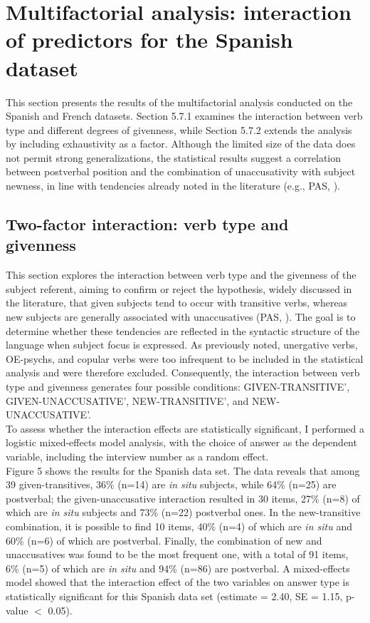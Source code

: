 \section{Multifactorial analysis: interaction of predictors for the Spanish dataset}

This section presents the results of the multifactorial analysis conducted on the Spanish and French datasets. Section 5.7.1 examines the interaction between verb type and different degrees of givenness, while Section 5.7.2 extends the analysis by including exhaustivity as a factor. Although the limited size of the data does not permit strong generalizations, the statistical results suggest a correlation between postverbal position and the combination of unaccusativity with subject newness, in line with tendencies already noted in the literature (e.g., PAS, \cite{du2003preferred}). 

\subsection{Two-factor interaction: verb type and givenness}
This section explores the interaction between verb type and the givenness of the subject referent, aiming to confirm or reject the hypothesis, widely discussed in the literature, that given subjects tend to occur with transitive verbs, whereas new subjects are generally associated with unaccusatives (PAS, \cite{du2003preferred}). The goal is to determine whether these tendencies are reflected in the syntactic structure of the language when subject focus is expressed.
As previously noted, unergative verbs, OE-psychs, and copular verbs were too infrequent to be included in the statistical analysis and were therefore excluded. Consequently, the interaction between verb type and givenness generates four possible conditions: {\selectfont GIVEN-TRANSITIVE}', {\selectfont GIVEN-UNACCUSATIVE}', {\selectfont NEW-TRANSITIVE}', and {\selectfont NEW-UNACCUSATIVE}'. \\
To assess whether the interaction effects are statistically significant, I performed a logistic mixed-effects model analysis, with the choice of answer as the dependent variable, including the interview number as a random effect.\\
Figure 5 shows the results for the Spanish data set. The data reveals that among 39 given-transitives, 36\% (n=14) are \textit{in situ} subjects, while 64\% (n=25) are postverbal; the given-unaccusative interaction resulted in 30 items, 27\% (n=8) of which are \textit{in situ} subjects and 73\% (n=22) postverbal ones. In the new-transitive combination, it is possible to find 10 items, 40\% (n=4) of which are \textit{in situ} and 60\% (n=6) of which are postverbal. Finally, the combination of new and unaccusatives was found to be the most frequent one, with a total of 91 items, 6\% (n=5) of which are \textit{in situ} and 94\% (n=86) are postverbal. A mixed-effects model showed that the interaction effect of the two variables on answer type is statistically significant for this Spanish data set (estimate = 2.40, SE = 1.15, p-value $<$  0.05).

